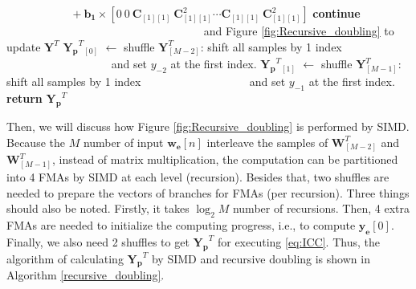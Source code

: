 \begin{algorithm}[t]
\begin{algorithmic}[1]
                    \Statex $ \quad\quad\quad\quad\quad~~~ + \bm{b_{1}} {\times}  \left[0 ~ 0 ~ \bm{C}_{[1][1]} ~ \bm{C}^2_{[1][1]} \cdots \bm{C}_{[1][1]} ~ \bm{C}^2_{[1][1]}\right]$ 
                    \State \textbf{continue} $\quad\quad\quad\quad~~$ 
                    \Statex $\quad\quad\quad\quad\quad\quad\quad\quad\quad\quad\quad\quad~~$ and Figure \ref{fig:Recursive_doubling} to update $\bm{Y}^T$
                \EndIf
            \EndFor
            \State $\bm{Y_p}^T$$_{[0]}$ $\gets $ shuffle $\bm{Y}^T_{[M-2]}$: shift all samples by 1 index
            \Statex $\quad\quad\quad\quad\quad\quad\quad\quad\quad$ and set $y_{-2}$ at the first index.
            \State $\bm{Y_p}^T$$_{[1]}$ $ \gets $ shuffle $\bm{Y}^T_{[M-1]}$: shift all samples by 1 index
            \Statex $\quad\quad\quad\quad\quad\quad\quad\quad\quad$ and set $y_{-1}$ at the first index.            
            \State \textbf{return} $\bm{Y_p}^T$ 
        \EndProcedure
    \end{algorithmic}
\end{algorithm}

Then, we will discuss how Figure \ref{fig:Recursive_doubling} is performed by SIMD.
Because the $M$ number of input $\bm{w_e}[n]$ interleave the samples of $\bm{W}^T_{[M-2]}$ and $\bm{W}^T_{[M-1]}$,
instead of matrix multiplication,
the computation can be partitioned into 4 FMAs by SIMD at each level (recursion). 
Besides that, two shuffles are needed to pre\-pare the vectors of branches for FMAs (per recursion).
Three things should also be noted. Firstly, it takes $\log_2M$ number of recursions.
Then, 4 extra FMAs are needed to initialize the 
computing progress, i.e., to compute $\bm{y_e}[0]$.
Finally, we also need 2 shuffles to get $\bm{Y_p}^T$ for executing \eqref{eq:ICC}.
Thus, the algorithm of calculating
$\bm{Y_p}^T$ by SIMD and recursive doubling is shown in Algorithm \ref{recursive_doubling}. 



